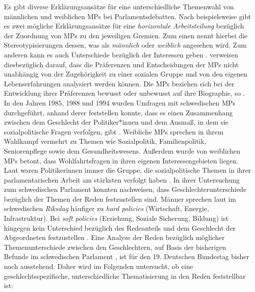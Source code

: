 \documentclass[12pt, 
    twoside=false, 
    bibliography=totoc, 
    numbers=endperiod, 
    headings=normal, 
    toc=chapterentrydotfill
    ]{scrbook}
\begin{document}
Es gibt diverse Erklärungsansätze für eine unterschiedliche Themenwahl von männlichen und weiblichen MPs bei Parlamentsdebatten. Nach \textcite{wangnerud_1996} beispielsweise gibt es zwei mögliche Erklärungsansätze für eine \emph{horizontale Arbeitsteilung} bezüglich der Zuordnung von MPs zu den jeweiligen Gremien. Zum einen nennt \citeauthor{wangnerud_1996} hierbei die Stereotypisierungen dessen, was als \emph{männlich} oder \emph{weiblich} angesehen wird. Zum anderen kann es auch Unterschiede bezüglich der Interessen geben \parencite{wangnerud_1996}.   \citeauthor{back_2014} verweisen diesbezüglich darauf, dass die Präferenzen und Entscheidungen der MPs nicht unabhängig von der Zugehörigkeit zu einer sozialen Gruppe und von den eigenen Lebenserfahrungen analysiert werden können. Die MPs beziehen sich bei der Entwicklung ihrer Präferenzen bewusst oder unbewusst auf ihre Biographie, so \textcite[507]{back_2014}. 
In den Jahren 1985, 1988 und 1994 wurden Umfragen mit schwedischen MPs durchgeführt, anhand derer \textcite[81]{wangnerud_2000} feststellen konnte, dass es einen Zusammenhang zwischen dem Geschlecht der Politiker*innen und dem Ausmaß, in dem sie sozialpolitische Fragen verfolgen, gibt \parencites[506]{back_2014}[82]{wangnerud_2000}. Weibliche MPs sprechen in ihrem Wahlkampf vermehrt zu Themen wie Sozialpolitik, Familienpolitik, Seniorenpflege sowie dem Gesundheitswesens. Außerdem wurde von weiblichen MPs betont, dass Wohlfahrtsfragen in ihren eigenen Interessengebieten liegen. Laut \textcite[82]{wangnerud_2000} waren Politikerinnen immer die Gruppe, die sozialpolitische Themen in ihrer parlamentarischen Arbeit am stärksten verfolgt haben \parencites[vgl.][507]{back_2014}.
In ihrer Untersuchung zum schwedischen Parlament konnten \textcite{back_2014} nachweisen, dass Geschlechterunterschiede bezüglich der Themen der Reden festzustellen sind. Männer sprechen laut \textcite{back_2014} im schwedischen \emph{Riksdag} häufiger zu \emph{hard policies} (Wirtschaft, Energie, Infrastruktur). Bei \emph{soft policies} (Erziehung, Soziale Sicherung, Bildung) ist hingegen kein Unterschied bezüglich des Redeanteils und dem Geschlecht der Abgeordneten festzustellen \parencite[514f.]{back_2014}. Eine Analyse der Reden bezüglich möglicher Themenunterschiede zwischen den Geschlechtern, auf Basis der bisherigen Befunde im schwedischen Parlament \parencites{wangnerud_2000}{wangnerud_2009}{back_2014}, ist für den 19. Deutschen Bundestag bisher noch ausstehend. Daher wird im Folgenden untersucht, ob eine geschlechtsspezifische, unterschiedliche Thematisierung in den Reden feststellbar ist: 
\end{document}
